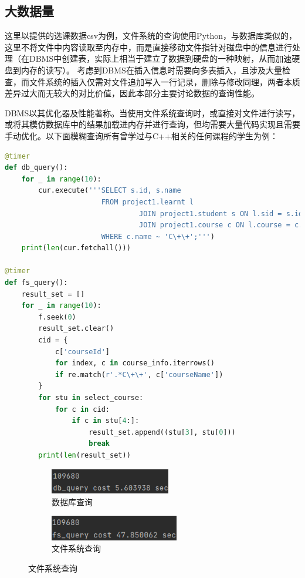 \subsection{大数据量}
这里以提供的选课数据csv为例，文件系统的查询使用Python，与数据库类似的，这里不将文件中内容读取至内存中，而是直接移动文件指针对磁盘中的信息进行处理（在DBMS中创建表，实际上相当于建立了数据到硬盘的一种映射，从而加速硬盘到内存的读写）。
考虑到DBMS在插入信息时需要向多表插入，且涉及大量检查，而文件系统的插入仅需对文件追加写入一行记录，删除与修改同理，两者本质差异过大而无较大的对比价值，因此本部分主要讨论数据的查询性能。
\par
DBMS以其优化器及性能著称。当使用文件系统查询时，或直接对文件进行读写，或将其模仿数据库中的结果加载进内存并进行查询，但均需要大量代码实现且需要手动优化。以下面模糊查询所有曾学过与C++相关的任何课程的学生为例：
\begin{lstlisting}[language=python]
@timer
def db_query():
    for _ in range(10):
        cur.execute('''SELECT s.id, s.name
                       FROM project1.learnt l
                                JOIN project1.student s ON l.sid = s.id
                                JOIN project1.course c ON l.course = c.cid
                       WHERE c.name ~ 'C\+\+';''')
    print(len(cur.fetchall()))

@timer
def fs_query():
    result_set = []
    for _ in range(10):
        f.seek(0)
        result_set.clear()
        cid = {
            c['courseId']
            for index, c in course_info.iterrows()
            if re.match(r'.*C\+\+', c['courseName'])
        }
        for stu in select_course:
            for c in cid:
                if c in stu[4:]:
                    result_set.append((stu[3], stu[0]))
                    break
        print(len(result_set))
\end{lstlisting}
\vspace{-3em}

\begin{figure}[!h]
	\centering
	\begin{subfigure}[b]{0.3\textwidth}
		\centerline{\includegraphics[height=1.1cm]{./dta/dbquery.png}}
		\caption{数据库查询}
	\end{subfigure}
	\qquad\quad
	\begin{subfigure}[b]{0.3\textwidth}
		\centerline{\includegraphics[height=1.1cm]{./dta/fsquery.png}}
		\caption{文件系统查询}
	\end{subfigure}
	\label{fig:visual_smap}
\end{figure}

